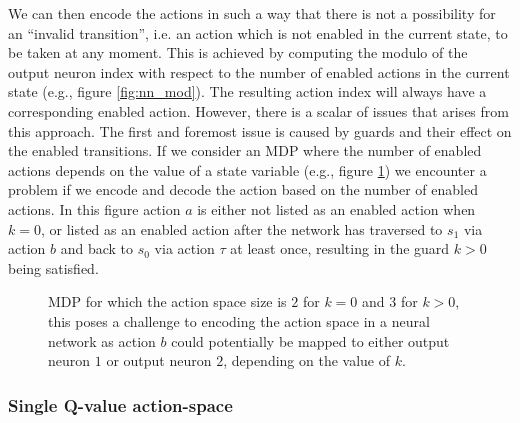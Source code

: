 We can then encode the actions in such a way that there is not a possibility for an ``invalid transition'', i.e. an action which is not enabled in the current state, to be taken at any moment. This is achieved by computing the modulo of the output neuron index with respect to the number of enabled actions in the current state (e.g., figure \ref{fig:nn_mod}). The resulting action index will always have a corresponding enabled action. However, there is a scalar of issues that arises from this approach. The first and foremost issue is caused by guards and their effect on the enabled transitions. If we consider an MDP where the number of enabled actions depends on the value of a state variable (e.g., figure \ref{fig:mdp_enabled_action_count}) we encounter a problem if we encode and decode the action based on the number of enabled actions. In this figure action $a$ is either not listed as an enabled action when $k = 0$, or listed as an enabled action after the network has traversed to $s_1$ via action $b$ and back to $s_0$ via action $\tau$ at least once, resulting in the guard $k > 0$ being satisfied.

\begin{figure}
    \centering
    \caption{MDP for which the action space size is $2$ for $k = 0$ and $3$ for $k > 0$, this poses a challenge to encoding the action space in a neural network as action $b$ could potentially be mapped to either output neuron $1$ or output neuron $2$, depending on the value of $k$.}
    \label{fig:mdp_enabled_action_count}
\end{figure}

\subsubsection{Single Q-value action-space}

